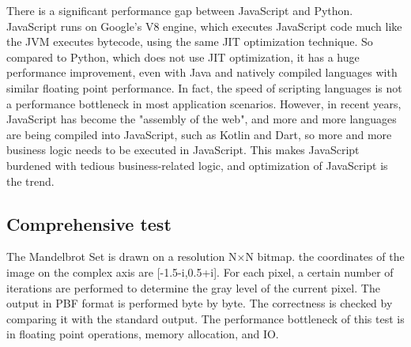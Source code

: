 There is a significant performance gap between JavaScript and Python. JavaScript runs on Google's V8 engine, which executes JavaScript code much like the JVM executes bytecode, using the same JIT optimization technique. So compared to Python, which does not use JIT optimization, it has a huge performance improvement, even with Java and natively compiled languages with similar floating point performance. In fact, the speed of scripting languages is not a performance bottleneck in most application scenarios. However, in recent years, JavaScript has become the "assembly of the web", and more and more languages are being compiled into JavaScript, such as Kotlin and Dart, so more and more business logic needs to be executed in JavaScript. This makes JavaScript burdened with tedious business-related logic, and optimization of JavaScript is the trend.

\subsection{Comprehensive test}

The Mandelbrot Set is drawn on a resolution N×N bitmap. the coordinates of the image on the complex axis are [-1.5-i,0.5+i]. For each pixel, a certain number of iterations are performed to determine the gray level of the current pixel. The output in PBF format is performed byte by byte. The correctness is checked by comparing it with the standard output. The performance bottleneck of this test is in floating point operations, memory allocation, and IO.

